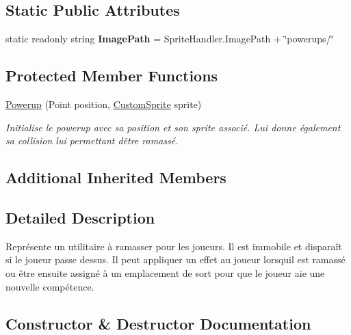 \subsection*{Static Public Attributes}
\begin{DoxyCompactItemize}
\item 
\mbox{\label{class_tentacle_slicers_1_1actors_1_1_powerup_ae8e50061f0084b2e77f8f1989c261ac7}} 
static readonly string {\bfseries Image\+Path} = Sprite\+Handler.\+Image\+Path + \char`\"{}powerups/\char`\"{}
\end{DoxyCompactItemize}
\subsection*{Protected Member Functions}
\begin{DoxyCompactItemize}
\item 
\hyperlink{class_tentacle_slicers_1_1actors_1_1_powerup_a651bc1ff0a40f7ae22f41ed3a0f6cddf}{Powerup} (Point position, \hyperlink{class_tentacle_slicers_1_1graphics_1_1_custom_sprite}{Custom\+Sprite} sprite)
\begin{DoxyCompactList}\small\item\em Initialise le powerup avec sa position et son sprite associé. Lui donne également sa collision lui permettant d\textquotesingle{}être ramassé. \end{DoxyCompactList}\end{DoxyCompactItemize}
\subsection*{Additional Inherited Members}


\subsection{Detailed Description}
Représente un utilitaire à ramasser pour les joueurs. Il est immobile et disparaît si le joueur passe dessus. Il peut appliquer un effet au joueur lorsqu\textquotesingle{}il est ramassé ou être ensuite assigné à un emplacement de sort pour que le joueur aie une nouvelle compétence. 



\subsection{Constructor \& Destructor Documentation}
\mbox{\label{class_tentacle_slicers_1_1actors_1_1_powerup_a651bc1ff0a40f7ae22f41ed3a0f6cddf}} 
